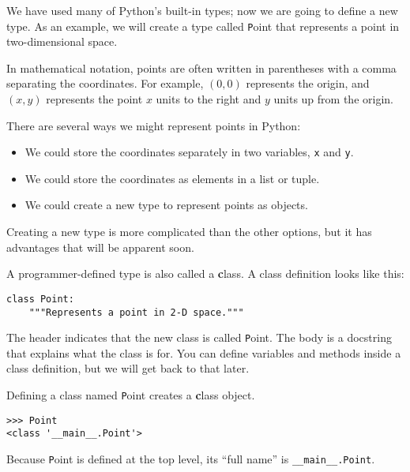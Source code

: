 \documentclass[
DIV=11,
fontsize=13,
twoside,
headinclude=false,
titlepage=firstiscover,
abstract=true,
headsepline=true,
footsepline=true,
chapterprefix=true, %
headings=big,
bibliography=totoc,%
captions=tableheading
]{scrbook}
\theoremstyle{definition}
\begin{document}
We have used many of Python's built-in types; now we are going
to define a new type.  As an example, we will create a type
called {\texttt Point} that represents a point in two-dimensional
space.

In mathematical notation, points are often written in
parentheses with a comma separating the coordinates. For example,
$(0,0)$ represents the origin, and $(x,y)$ represents the
point $x$ units to the right and $y$ units up from the origin.

There are several ways we might represent points in Python:

\begin{itemize}

\item We could store the coordinates separately in two
variables, {\texttt x} and {\texttt y}.

\item We could store the coordinates as elements in a list
or tuple.

\item We could create a new type to represent points as
objects.

\end{itemize}

Creating a new type
is more complicated than the other options, but
it has advantages that will be apparent soon.

A programmer-defined type is also called a {\textbf class}.
A class definition looks like this:

\begin{lstlisting}
class Point:
    """Represents a point in 2-D space."""
\end{lstlisting}
%
The header indicates that the new class is called {\texttt Point}.
The body is a docstring that explains what the class is for.
You can define variables and methods inside a class definition,
but we will get back to that later.

Defining a class named {\texttt Point} creates a {\textbf class object}.

\begin{lstlisting}
>>> Point
<class '__main__.Point'>
\end{lstlisting}
%
Because {\texttt Point} is defined at the top level, its ``full
name'' is \verb"__main__.Point".
\end{document}
